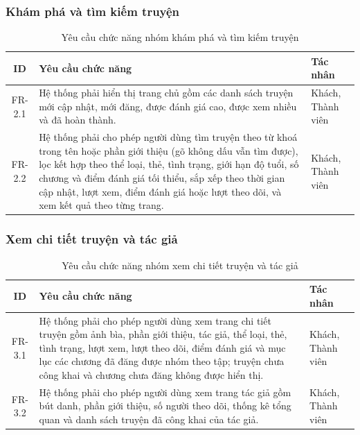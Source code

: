 \subsubsection{Khám phá và tìm kiếm truyện}

\begin{table}[H]
\centering
\renewcommand{\arraystretch}{1.3}
\begin{tabularx}{\textwidth}{|c|X|p{3cm}|}
\hline
\textbf{ID} & \textbf{Yêu cầu chức năng} & \textbf{Tác nhân} \\ \hline
FR-2.1 & Hệ thống phải hiển thị trang chủ gồm các danh sách truyện mới cập nhật, mới đăng, được đánh giá cao, được xem nhiều và đã hoàn thành. & Khách, Thành viên \\ \hline
FR-2.2 & Hệ thống phải cho phép người dùng tìm truyện theo từ khoá trong tên hoặc phần giới thiệu (gõ không dấu vẫn tìm được), lọc kết hợp theo thể loại, thẻ, tình trạng, giới hạn độ tuổi, số chương và điểm đánh giá tối thiểu, sắp xếp theo thời gian cập nhật, lượt xem, điểm đánh giá hoặc lượt theo dõi, và xem kết quả theo từng trang. & Khách, Thành viên \\ \hline
\end{tabularx}
\caption{Yêu cầu chức năng nhóm khám phá và tìm kiếm truyện}
\label{tab:fr-discover}
\end{table}

\subsubsection{Xem chi tiết truyện và tác giả}

\begin{table}[H]
\centering
\renewcommand{\arraystretch}{1.3}
\begin{tabularx}{\textwidth}{|c|X|p{3cm}|}
\hline
\textbf{ID} & \textbf{Yêu cầu chức năng} & \textbf{Tác nhân} \\ \hline
FR-3.1 & Hệ thống phải cho phép người dùng xem trang chi tiết truyện gồm ảnh bìa, phần giới thiệu, tác giả, thể loại, thẻ, tình trạng, lượt xem, lượt theo dõi, điểm đánh giá và mục lục các chương đã đăng được nhóm theo tập; truyện chưa công khai và chương chưa đăng không được hiển thị. & Khách, Thành viên \\ \hline
FR-3.2 & Hệ thống phải cho phép người dùng xem trang tác giả gồm bút danh, phần giới thiệu, số người theo dõi, thống kê tổng quan và danh sách truyện đã công khai của tác giả. & Khách, Thành viên \\ \hline
\end{tabularx}
\caption{Yêu cầu chức năng nhóm xem chi tiết truyện và tác giả}
\label{tab:fr-detail}
\end{table}

